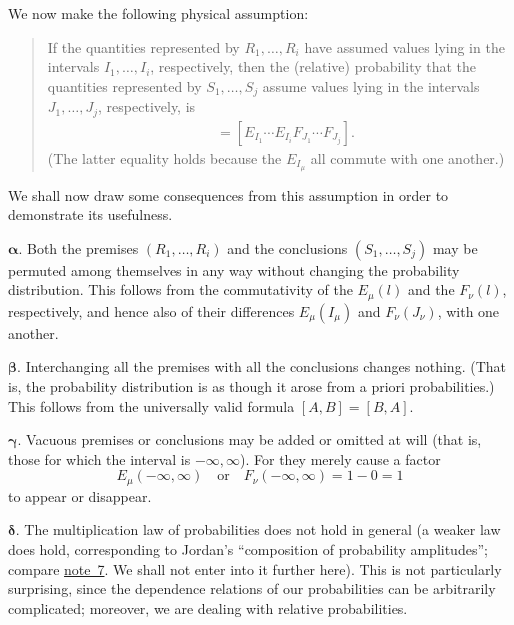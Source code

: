 \documentclass[fontsize=13pt,paper=b5,twoside,bookmarkpackage=false]{scrartcl}
\newcommand{\fnref}[1]{\hyperref[fn:#1]{note~#1}}
\begin{document}
We now make the following physical assumption:
\begin{quote}
If the quantities represented by $R_1,\ldots,R_i$ have assumed values lying in the intervals $I_1,\ldots,I_i$, respectively, then the (relative) probability that the quantities represented by $S_1,\ldots,S_j$ assume values lying in the intervals $J_1,\ldots,J_j$, respectively, is
\begin{align*}
 [E_{I_1}\cdots E_{I_i},F_{J_1}\cdots F_{J_j}]
 &= [E_{I_1}\cdots E_{I_i}F_{J_1}\cdots F_{J_j}].
\end{align*}
(The latter equality holds because the $E_{I_\mu}$ all commute with one another.)
\end{quote}
We shall now draw some consequences from this assumption in order to demonstrate its usefulness.

\par\medskip\noindent$\boldsymbol{\alpha.}$ Both the premises $(R_1,\ldots,R_i)$ and the conclusions $(S_1,\ldots,S_j)$ may be permuted among themselves in any way without changing the probability distribution. This follows from the commutativity of the $E_\mu(l)$ and the $F_\nu(l)$, respectively, and hence also of their differences $E_\mu(I_\mu)$ and $F_\nu(J_\nu)$, with one another.

\par\medskip\noindent$\boldsymbol{\beta.}$ Interchanging all the premises with all the conclusions changes nothing. (That is, the probability distribution is as though it arose from a priori probabilities.) This follows from the universally valid formula \hyperref[eq:XI:pair-symmetry]{$[A,B]=[B,A]$}.

\par\medskip\noindent$\boldsymbol{\gamma.}$ Vacuous premises or conclusions may be added or omitted at will (that is, those for which the interval is $-\infty,\infty$). For they merely cause a factor
\[
 E_\mu(-\infty,\infty)\quad\text{or}\quad F_\nu(-\infty,\infty)
 =1-0=1
\]
to appear or disappear.

\par\medskip\noindent$\boldsymbol{\delta.}$ The multiplication law of probabilities does not hold in general (a weaker law does hold, corresponding to Jordan's ``composition of probability amplitudes''; compare \fnref{7}. We shall not enter into it further here). This is not particularly surprising, since the dependence relations of our probabilities can be arbitrarily complicated; moreover, we are dealing with relative probabilities.
\end{document}
